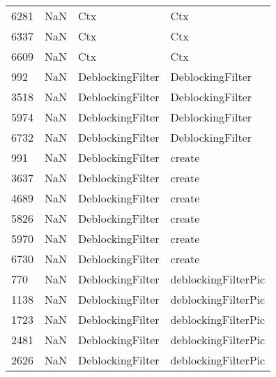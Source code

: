 \begin{tabular}{llll}
6281 &                   NaN &                        Ctx &                                       Ctx \\
6337 &                   NaN &                        Ctx &                                       Ctx \\
6609 &                   NaN &                        Ctx &                                       Ctx \\
992  &                   NaN &           DeblockingFilter &                          DeblockingFilter \\
3518 &                   NaN &           DeblockingFilter &                          DeblockingFilter \\
5974 &                   NaN &           DeblockingFilter &                          DeblockingFilter \\
6732 &                   NaN &           DeblockingFilter &                          DeblockingFilter \\
991  &                   NaN &           DeblockingFilter &                                    create \\
3637 &                   NaN &           DeblockingFilter &                                    create \\
4689 &                   NaN &           DeblockingFilter &                                    create \\
5826 &                   NaN &           DeblockingFilter &                                    create \\
5970 &                   NaN &           DeblockingFilter &                                    create \\
6730 &                   NaN &           DeblockingFilter &                                    create \\
770  &                   NaN &           DeblockingFilter &                       deblockingFilterPic \\
1138 &                   NaN &           DeblockingFilter &                       deblockingFilterPic \\
1723 &                   NaN &           DeblockingFilter &                       deblockingFilterPic \\
2481 &                   NaN &           DeblockingFilter &                       deblockingFilterPic \\
2626 &                   NaN &           DeblockingFilter &                       deblockingFilterPic \\

\end{tabular}
